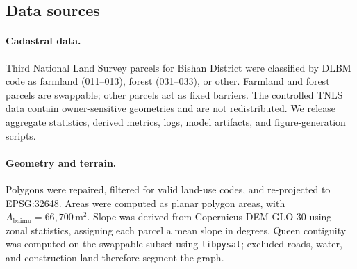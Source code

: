 \documentclass[preprint,12pt]{elsarticle}
\begin{document}
\begin{table}[htbp]
\centering
\caption{Township characteristics and block-level aggregation. ``Init.\ \textit{baimu}'' is the initial number of qualifying 6.67-ha contiguous farmland components.}
\label{tab:townships}
\end{table}

\subsection{Data sources}

\paragraph{Cadastral data.} Third National Land Survey parcels for Bishan District were classified by DLBM code as farmland (011--013), forest (031--033), or other. Farmland and forest parcels are swappable; other parcels act as fixed barriers. The controlled TNLS data contain owner-sensitive geometries and are not redistributed. We release aggregate statistics, derived metrics, logs, model artifacts, and figure-generation scripts.

\paragraph{Geometry and terrain.} Polygons were repaired, filtered for valid land-use codes, and re-projected to EPSG:32648. Areas were computed as planar polygon areas, with $A_{\text{baimu}} = 66{,}700\,\text{m}^2$. Slope was derived from Copernicus DEM GLO-30 \citep{copernicus2021dem} using zonal statistics, assigning each parcel a mean slope in degrees. Queen contiguity was computed on the swappable subset using \texttt{libpysal}; excluded roads, water, and construction land therefore segment the graph.
\end{document}
